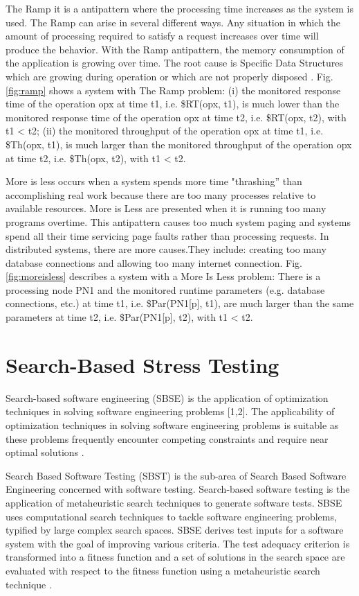 \documentclass{report}
\begin{document}
The Ramp it is a antipattern where the processing time increases as the system is used. The Ramp can arise in several different ways. Any situation in which the amount of processing required to satisfy a request increases over time will produce the behavior. With the Ramp antipattern, the memory consumption of the application is growing over time. The root cause is Specific Data Structures which are growing during operation or which are not properly disposed \cite{Wert2014} \cite{Smith2003}. Fig. \ref{fig:ramp} shows a system  with The Ramp problem:  (i) the monitored response time of the operation opx at time t1, i.e. \$RT(opx, t1), is much lower than the monitored response time of the operation opx at time t2, i.e. \$RT(opx, t2), with t1 < t2; (ii) the monitored throughput of the operation opx at time t1, i.e. \$Th(opx, t1), is much larger than the monitored throughput of the operation opx at time t2, i.e. \$Th(opx, t2), with t1 < t2. 

More is less occurs when a system spends more time "thrashing” than accomplishing real work because there are too many processes relative to available resources. More is Less are presented when it is running too many programs overtime. This antipattern causes too much system paging and systems spend all their time servicing page faults rather than processing requests. In distributed systems, there are more causes.They include: creating too many database connections and  allowing too many internet connection. Fig. \ref{fig:moreisless} describes a system  with a More Is Less problem: There is a processing node PN1 and the monitored runtime parameters (e.g. database connections, etc.) at time t1, i.e. \$Par(PN1[p], t1), are much larger than the same parameters at time t2, i.e. \$Par(PN1[p], t2), with t1 < t2. 

\chapter{Search-Based Stress Testing}

Search-based software engineering (SBSE) is the application of optimization techniques in solving software engineering problems [1,2]. The applicability of optimization techniques in solving software engineering problems is suitable as these problems frequently encounter competing constraints and require near optimal solutions \cite{Afzal2009a} \cite{Harman2015}. 


Search Based Software Testing (SBST) is the sub-area of Search Based Software Engineering concerned with software testing. Search-based software testing is the application of metaheuristic search techniques to generate software tests. SBSE uses computational search techniques to tackle software engineering problems, typified by large complex search spaces. SBSE derives test inputs for a software system with the goal of improving various criteria. The test adequacy criterion is transformed into a fitness function and a set of solutions in the search space are evaluated with respect to the fitness function using a metaheuristic search technique \cite{Afzal2009a} \cite{Aleti2016} \cite{Harman2015}.
\end{document}
